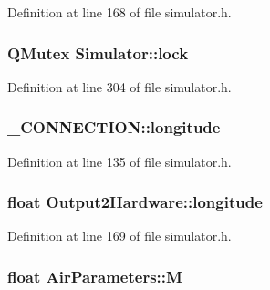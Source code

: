\-Definition at line 168 of file simulator.\-h.

\hypertarget{group___h_i_t_l_plugin_ga807f372f1fd1876041ae159adca0514b}{
\subsubsection[{lock}]{\setlength{\rightskip}{0pt plus 5cm}\-Q\-Mutex {\bf \-Simulator\-::lock}}}\label{group___h_i_t_l_plugin_ga807f372f1fd1876041ae159adca0514b}


\-Definition at line 304 of file simulator.\-h.

\hypertarget{group___h_i_t_l_plugin_gac60d13c120d3dd97309688a1d7f3d6d7}{
\subsubsection[{longitude}]{ {\bf \-\_\-\-C\-O\-N\-N\-E\-C\-T\-I\-O\-N\-::longitude}}}\label{group___h_i_t_l_plugin_gac60d13c120d3dd97309688a1d7f3d6d7}


\-Definition at line 135 of file simulator.\-h.

\hypertarget{group___h_i_t_l_plugin_gacf92ed715333315d33a77f42aa1ed71e}{
\subsubsection[{longitude}]{\setlength{\rightskip}{0pt plus 5cm}float {\bf \-Output2\-Hardware\-::longitude}}}\label{group___h_i_t_l_plugin_gacf92ed715333315d33a77f42aa1ed71e}


\-Definition at line 169 of file simulator.\-h.

\hypertarget{group___h_i_t_l_plugin_gaa24db2a922b9f638fdaacad6e3f4fb91}{
\subsubsection[{\-M}]{\setlength{\rightskip}{0pt plus 5cm}float {\bf \-Air\-Parameters\-::\-M}}}\label{group___h_i_t_l_plugin_gaa24db2a922b9f638fdaacad6e3f4fb91}



